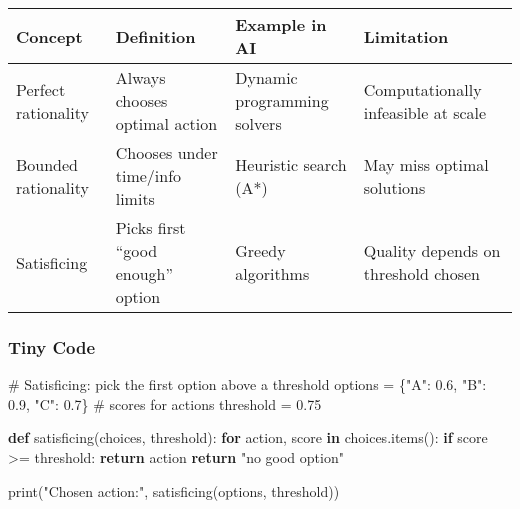 \documentclass[
  letterpaper,
  DIV=11,
  numbers=noendperiod]{scrreprt}
\newenvironment{Shaded}{\begin{snugshade}}{\end{snugshade}}
\newcommand{\BuiltInTok}[1]{\textcolor[rgb]{0.00,0.23,0.31}{#1}}
\newcommand{\CommentTok}[1]{\textcolor[rgb]{0.37,0.37,0.37}{#1}}
\newcommand{\ControlFlowTok}[1]{\textcolor[rgb]{0.00,0.23,0.31}{\textbf{#1}}}
\newcommand{\FloatTok}[1]{\textcolor[rgb]{0.68,0.00,0.00}{#1}}
\newcommand{\KeywordTok}[1]{\textcolor[rgb]{0.00,0.23,0.31}{\textbf{#1}}}
\newcommand{\NormalTok}[1]{\textcolor[rgb]{0.00,0.23,0.31}{#1}}
\newcommand{\OperatorTok}[1]{\textcolor[rgb]{0.37,0.37,0.37}{#1}}
\newcommand{\StringTok}[1]{\textcolor[rgb]{0.13,0.47,0.30}{#1}}
\begin{document}
\begin{longtable}[]{@{}
  >{\raggedright\arraybackslash}p{}
  >{\raggedright\arraybackslash}p{}
  >{\raggedright\arraybackslash}p{}
  >{\raggedright\arraybackslash}p{}@{}}
\toprule\noalign{}
\begin{minipage}[b]{\linewidth}\raggedright
Concept
\end{minipage} & \begin{minipage}[b]{\linewidth}\raggedright
Definition
\end{minipage} & \begin{minipage}[b]{\linewidth}\raggedright
Example in AI
\end{minipage} & \begin{minipage}[b]{\linewidth}\raggedright
Limitation
\end{minipage} \\
\midrule\noalign{}
\endhead
\bottomrule\noalign{}
\endlastfoot
Perfect rationality & Always chooses optimal action & Dynamic
programming solvers & Computationally infeasible at scale \\
Bounded rationality & Chooses under time/info limits & Heuristic search
(A*) & May miss optimal solutions \\
Satisficing & Picks first ``good enough'' option & Greedy algorithms &
Quality depends on threshold chosen \\
\end{longtable}

\subsubsection{Tiny Code}\label{tiny-code-4}

\begin{Shaded}
\begin{Highlighting}[]
\CommentTok{\# Satisficing: pick the first option above a threshold}
\NormalTok{options }\OperatorTok{=}\NormalTok{ \{}\StringTok{"A"}\NormalTok{: }\FloatTok{0.6}\NormalTok{, }\StringTok{"B"}\NormalTok{: }\FloatTok{0.9}\NormalTok{, }\StringTok{"C"}\NormalTok{: }\FloatTok{0.7}\NormalTok{\}  }\CommentTok{\# scores for actions}
\NormalTok{threshold }\OperatorTok{=} \FloatTok{0.75}

\KeywordTok{def}\NormalTok{ satisficing(choices, threshold):}
    \ControlFlowTok{for}\NormalTok{ action, score }\KeywordTok{in}\NormalTok{ choices.items():}
        \ControlFlowTok{if}\NormalTok{ score }\OperatorTok{\textgreater{}=}\NormalTok{ threshold:}
            \ControlFlowTok{return}\NormalTok{ action}
    \ControlFlowTok{return} \StringTok{"no good option"}

\BuiltInTok{print}\NormalTok{(}\StringTok{"Chosen action:"}\NormalTok{, satisficing(options, threshold))}
\end{Highlighting}
\end{Shaded}
\end{document}
